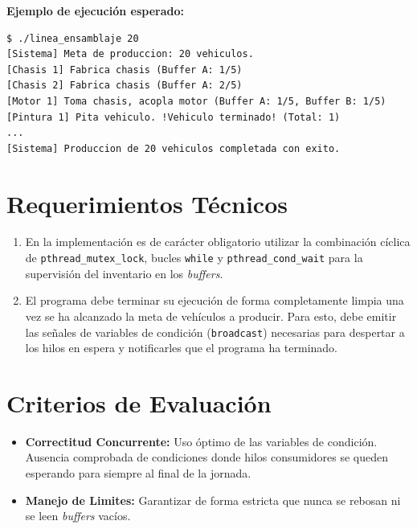 \documentclass[12pt,a4paper]{article}
\begin{document}
\newpage

\textbf{Ejemplo de ejecución esperado:} 
\begin{lstlisting}[numbers=none]
$ ./linea_ensamblaje 20
[Sistema] Meta de produccion: 20 vehiculos.
[Chasis 1] Fabrica chasis (Buffer A: 1/5)
[Chasis 2] Fabrica chasis (Buffer A: 2/5)
[Motor 1] Toma chasis, acopla motor (Buffer A: 1/5, Buffer B: 1/5)
[Pintura 1] Pita vehiculo. !Vehiculo terminado! (Total: 1)
...
[Sistema] Produccion de 20 vehiculos completada con exito.
\end{lstlisting}

\section*{Requerimientos Técnicos}
\begin{enumerate}
    \item En la implementación es de carácter obligatorio utilizar la combinación cíclica de \texttt{pthread\_mutex\_lock}, bucles \texttt{while} y \texttt{pthread\_cond\_wait} para la supervisión del inventario en los \textit{buffers}.
    \item El programa debe terminar su ejecución de forma completamente limpia una vez se ha alcanzado la meta de vehículos a producir. Para esto, debe emitir las señales de variables de condición (\texttt{broadcast}) necesarias para despertar a los hilos en espera y notificarles que el programa ha terminado.
\end{enumerate}

\section*{Criterios de Evaluación}
\begin{itemize}
    \item \textbf{Correctitud Concurrente:} Uso óptimo de las variables de condición. Ausencia comprobada de condiciones donde hilos consumidores se queden esperando para siempre al final de la jornada.
    \item \textbf{Manejo de Limites:} Garantizar de forma estricta que nunca se rebosan ni se leen \textit{buffers} vacíos.
\end{itemize}
\end{document}
